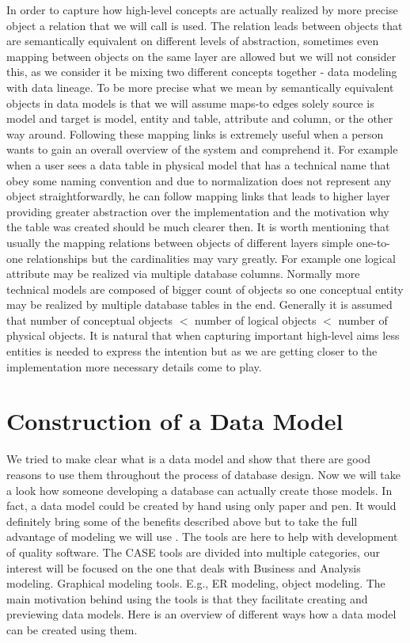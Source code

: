 In order to capture how high-level concepts are actually realized by more precise object a relation that we will call  is used. The relation leads between objects that are semantically equivalent on different levels of abstraction, sometimes even mapping between objects on the same layer are allowed but we will not consider this, as we consider it be mixing two different concepts together - data modeling with data lineage. To be more precise what we mean by semantically equivalent objects in data models is that we will assume maps-to edges solely source is model and target is model, entity and table, attribute and column, or the other way around.
Following these mapping links is extremely useful when a person wants to gain an overall overview of the system and comprehend it. For example when a user sees a data table in physical model that has a technical name that obey some naming convention and due to normalization does not represent any object straightforwardly, he can follow mapping links that leads to higher layer providing greater  abstraction over the implementation and the motivation why the table was created should be much clearer then.
It is worth mentioning that usually the mapping relations between objects of different layers simple one-to-one relationships but the cardinalities may vary greatly. For example one logical attribute may be realized via multiple database columns.
Normally more technical models are composed of bigger count of objects so one conceptual entity may be realized by multiple database tables in the end. Generally it is assumed that number of conceptual objects $<$ number of logical objects $<$ number of physical objects. It is natural that when capturing important high-level aims less entities is needed to express the intention but as we are getting closer to the implementation more necessary details come to play.

\section{Construction of a Data Model}

We tried to make clear what is a data model and show that there are good reasons to use them throughout the process of database design.
Now we will take a look how someone developing a database can actually create those models.
In fact, a data model could be created by hand using only paper and pen. It would definitely bring some of the benefits described above but to take the full advantage of modeling we will use . The tools are here to help with development of quality software. The CASE tools are divided into multiple categories, our interest will be focused on the one that deals with Business and Analysis modeling. Graphical modeling tools. E.g., ER modeling, object modeling.
The main motivation behind using the tools is that they facilitate creating and previewing data models. Here is an overview of different ways how a data model can be created using them.

